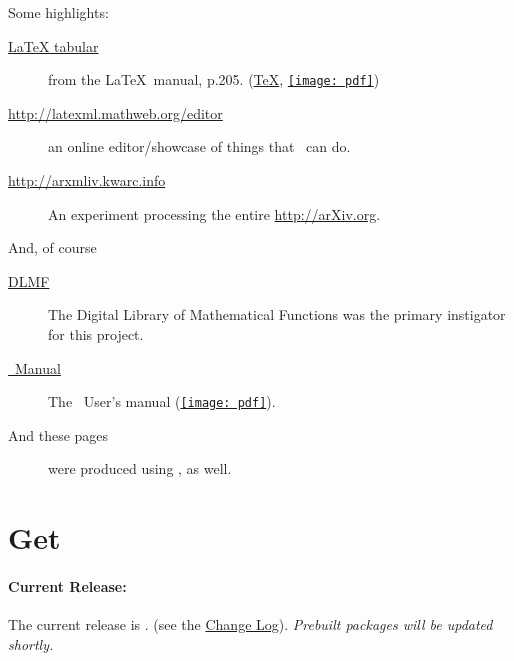 \documentclass{article}
\newcommand{\PDFIcon}{\texttt{[image: pdf]}}
\begin{document}
Some highlights:
\begin{description}
\item[\href{examples/tabular/tabular.html}{LaTeX tabular}]
    from the \LaTeX\ manual, p.205.
    (\href{examples/tabular/tabular.tex}{\TeX},
     \href{examples/tabular/tabular.pdf}{\PDFIcon})
\item[\url{http://latexml.mathweb.org/editor}] an online editor/showcase
  of things that \LaTeXML\ can do.
\item[\url{http://arxmliv.kwarc.info}] An experiment processing
  the entire \url{http://arXiv.org}.
\end{description}
And, of course
\begin{description}
\item[\href{http://dlmf.nist.gov/}{DLMF}]
   The Digital Library of Mathematical Functions was the
   primary instigator for this project.
\item[\href{manual/}{\LaTeXML\ Manual}]
   The \LaTeXML\ User's manual (\href{manual.pdf}{\PDFIcon}).
\item[And these pages] were produced using \LaTeXML, as well.
\end{description}

\section{Get \LaTeXML}\label{get}
\paragraph{Current Release:}\label{download.current}
The current release is \CurrentVersion. (see the \href{Changes}{Change Log}).
\emph{Prebuilt packages will be updated shortly.}
\end{document}

